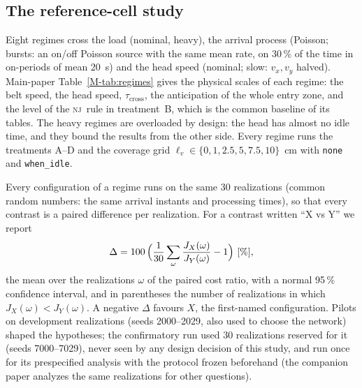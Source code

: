 \documentclass[11pt,a4paper]{article}
\newcommand{\nj}{\textsc{nj}}
\newcommand{\tcross}{\tau_{\mathrm{cross}}}
\newcommand{\lv}{\ell_{v}}
\begin{document}
\subsection{The reference-cell study}\label{sup:refdesign}
Eight regimes cross the load (nominal, heavy), the arrival process (Poisson; bursts: an
on/off Poisson source with the same mean rate, on 30\,\% of the time in on-periods of mean
20~s) and the head speed (nominal; slow: $v_x,v_y$ halved). Main-paper Table~\ref{M-tab:regimes} gives
the physical scales of each regime: the belt speed, the head speed, $\tcross$, the
anticipation of the whole entry zone, and the level of the \nj\ rule in treatment~B, which
is the common baseline of its tables. The heavy regimes are overloaded by design: the
head has almost no idle time, and they bound the results from the other side. Every
regime runs the treatments A--D and the coverage grid $\lv\in\{0,1,2.5,5,7.5,10\}$~cm
with \texttt{none} and \texttt{when\_idle}.

Every configuration of a regime runs on the same 30 realizations (common random numbers:
the same arrival instants and processing times), so that every contrast is a paired
difference per realization. For a contrast written ``X vs Y'' we report
\[
\Delta=100\,\Bigl(\frac{1}{30}\sum_{\omega}\frac{J_X(\omega)}{J_Y(\omega)}-1\Bigr)\ [\%],
\]
the mean over the realizations $\omega$ of the paired cost ratio, with a normal 95\,\%
confidence interval, and in parentheses the number of realizations in which
$J_X(\omega)<J_Y(\omega)$. A negative $\Delta$ favours $X$, the first-named
configuration. Pilots on development realizations (seeds 2000--2029, also used to choose
the network) shaped the hypotheses; the confirmatory run used 30 realizations reserved for
it (seeds 7000--7029), never seen by any design decision of this study, and run once for
its prespecified analysis with the protocol frozen beforehand (the companion paper
analyzes the same realizations for other questions).
\end{document}
